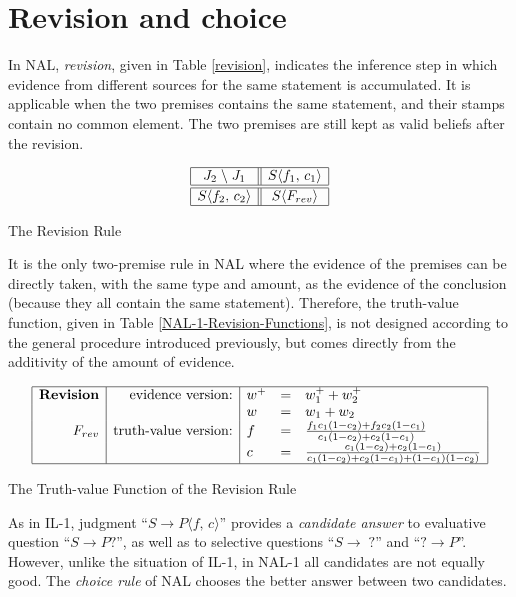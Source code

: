 \section{Revision and choice}

In NAL, {\em revision}, given in Table \ref{revision}, indicates the inference step in which evidence from different sources for the same statement is accumulated. It is applicable when the two premises contains the same statement, and their stamps contain no common element. The two premises are still kept as valid beliefs after the revision.

\begin{table}[htb]
\[\begin{array}{|c||c|} \hline
J_2 \; \backslash \; J_1  & S \langle f_1, \, c_1\rangle  \\
\hline \hline
S \langle f_2, \, c_2\rangle  & S \langle F_{rev}\rangle \\
\hline \end{array}\]
\caption{The Revision Rule}
\label{revision}
\end{table}

It is the only two-premise rule in NAL where the evidence of the premises can be directly taken, with the same type and amount, as the evidence of the conclusion (because they all contain the same statement). Therefore, the truth-value function, given in Table \ref{NAL-1-Revision-Functions}, is not designed according to the general procedure introduced previously, but comes directly from the additivity of the amount of evidence.

\begin{table}[htb]
\[\begin{array}{|r|r|lcl|} \hline
\mbox{\textbf{Revision}} & \mbox{evidence version:} & w^+ & = & w^+_1 + w^+_2 \\
								           &					                 & w & = & w_1 + w_2 \\
                   F_{rev} & \mbox{truth-value version:} & f & = & \frac{f_1c_1(1-c_2)+f_2c_2(1-c_1)}{c_1(1-c_2)+c_2(1-c_1)} \\
								           &					                   & c & = & \frac{c_1(1-c_2)+c_2(1-c_1)}{c_1(1-c_2)+c_2(1-c_1)+(1-c_1)(1-c_2)}\\
\hline \end{array}\]
\caption{The Truth-value Function of the Revision Rule}
\label{NAL-1-Revision-Functions}
\end{table}

As in IL-1, judgment ``\(S \rightarrow P \langle f, \, c\rangle \)'' provides a \emph{candidate answer} to evaluative question ``\(S \rightarrow P ?\)'', as well as to selective questions ``\(S \rightarrow\; ?\)'' and ``\(? \rightarrow P\)''. However, unlike the situation of IL-1, in NAL-1 all candidates are not equally good. The \emph{choice rule} of NAL chooses the better answer between two candidates.

